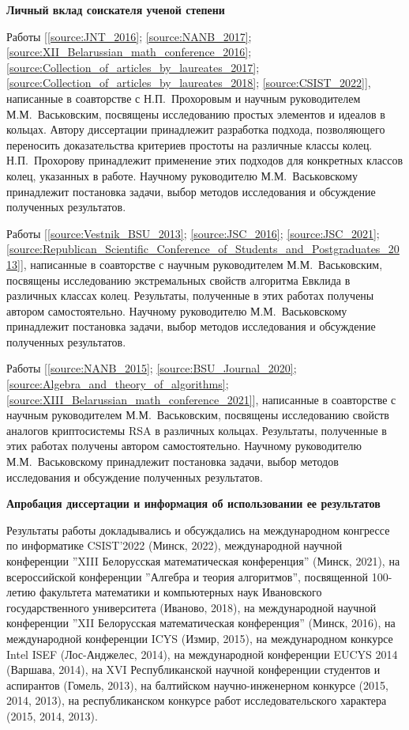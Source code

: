\documentclass[_00_autoref.tex]{subfiles}
\begin{document}
\medskip
\centerline{\textbf{Личный вклад соискателя ученой степени}}

Работы [\ref{source:JNT_2016}; \ref{source:NANB_2017}; \ref{source:XII_Belarussian_math_conference_2016}; \ref{source:Collection_of_articles_by_laureates_2017}; \ref{source:Collection_of_articles_by_laureates_2018}; \ref{source:CSIST_2022}], написанные в соавторстве с Н.П.~Прохоровым и научным руководителем М.М.~Васьковским, посвящены исследованию простых элементов и идеалов в кольцах.
Автору диссертации принадлежит разработка подхода, позволяющего переносить доказательства критериев простоты на различные классы колец.
Н.П.~Прохорову принадлежит применение этих подходов для конкретных классов колец, указанных в работе.
Научному руководителю М.М.~Васьковскому принадлежит постановка задачи, выбор методов исследования и обсуждение полученных результатов.

Работы [\ref{source:Vestnik_BSU_2013}; \ref{source:JSC_2016}; \ref{source:JSC_2021}; \ref{source:Republican_Scientific_Conference_of_Students_and_Postgraduates_2013}], написанные в соавторстве с научным руководителем М.М.~Васьковским, посвящены исследованию экстремальных свойств алгоритма Евклида в различных  классах колец.
Результаты, полученные  в этих работах получены  автором самостоятельно.
Научному руководителю М.М.~Васьковскому принадлежит постановка задачи, выбор методов исследования и обсуждение полученных результатов.

Работы [\ref{source:NANB_2015}; \ref{source:BSU_Journal_2020}; \ref{source:Algebra_and_theory_of_algorithms}; \ref{source:XIII_Belarussian_math_conference_2021}], написанные в соавторстве с научным руководителем М.М.~Васьковским, посвящены исследованию свойств аналогов криптосистемы RSA в различных кольцах.
Результаты, полученные  в этих работах получены  автором самостоятельно.
Научному руководителю М.М.~Васьковскому принадлежит постановка задачи, выбор методов исследования и обсуждение полученных результатов.

\medskip
\centerline{\textbf{Апробация диссертации и информация об использовании ее результатов}}

Результаты работы докладывались и обсуждались на международном конгрессе по информатике CSIST'2022 (Минск, 2022), международной научной конференции ''XIII Белорусская математическая конференция'' (Минск, 2021), на всероссийской конференции ''Алгебра и теория алгоритмов'', посвященной 100-летию факультета математики и компьютерных наук Ивановского государственного университета (Иваново, 2018), на международной научной конференции ''XII Белорусская математическая конференция'' (Минск, 2016), на международной конференции ICYS (Измир, 2015), на международном конкурсе Intel ISEF (Лос-Анджелес, 2014), на международной конференции EUCYS 2014 (Варшава, 2014), на XVI Республиканской научной конференции студентов и аспирантов (Гомель, 2013), на балтийском научно-инженерном конкурсе (2015, 2014, 2013), на республиканском конкурсе работ исследовательского характера (2015, 2014, 2013).
\end{document}

